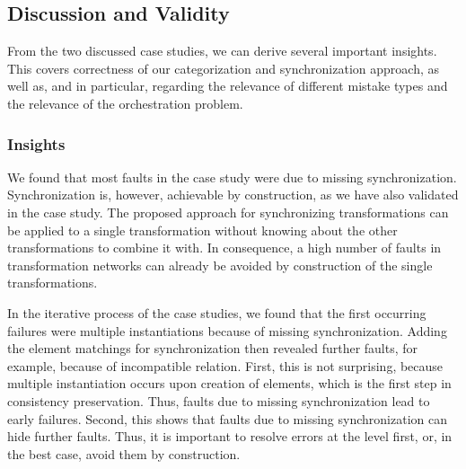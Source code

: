 



\subsection{Discussion and Validity}

From the two discussed case studies, we can derive several important insights.
This covers correctness of our categorization and synchronization approach, as well as, and in particular, regarding the relevance of different mistake types and the relevance of the orchestration problem.

\subsubsection{Insights}

We found that most faults in the case study were due to missing synchronization.
Synchronization is, however, achievable by construction, as we have also validated in the case study.
The proposed approach for synchronizing transformations can be applied to a single transformation without knowing about the other transformations to combine it with.
In consequence, a high number of faults in transformation networks can already be avoided by construction of the single transformations.

In the iterative process of the case studies, we found that the first occurring failures were multiple instantiations because of missing synchronization.
Adding the element matchings for synchronization then revealed further faults, for example, because of incompatible relation.
First, this is not surprising, because multiple instantiation occurs upon creation of elements, which is the first step in consistency preservation.
Thus, faults due to missing synchronization lead to early failures.
Second, this shows that faults due to missing synchronization can hide further faults.
Thus, it is important to resolve errors at the \leveltransformation level first, or, in the best case, avoid them by construction.

